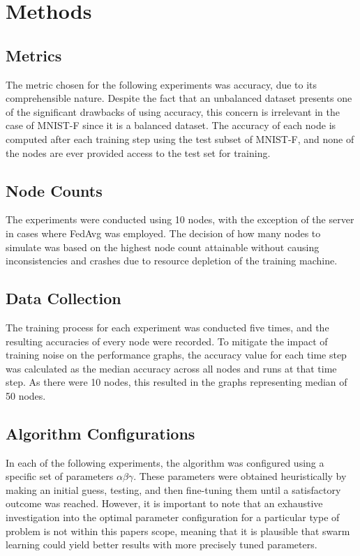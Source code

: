 \section{Methods}
\subsection{Metrics}
The metric chosen for the following experiments was accuracy, due to its comprehensible nature. Despite the fact that an unbalanced dataset presents one of the significant drawbacks of using accuracy, this concern is irrelevant in the case of MNIST-F since it is a balanced dataset. The accuracy of each node is computed after each training step using the test subset of MNIST-F, and none of the nodes are ever provided access to the test set for training.

\subsection{Node Counts}
The experiments were conducted using 10 nodes, with the exception of the server in cases where FedAvg was employed. The decision of how many nodes to simulate was based on the highest node count attainable without causing inconsistencies and crashes due to resource depletion of the training machine.

\subsection{Data Collection}
The training process for each experiment was conducted five times, and the resulting accuracies of every node were recorded. To mitigate the impact of training noise on the performance graphs, the accuracy value for each time step was calculated as the median accuracy across all nodes and runs at that time step. As there were 10 nodes, this resulted in the graphs representing median of 50 nodes.

\subsection{Algorithm Configurations}
In each of the following experiments, the algorithm was configured using a specific set of parameters $\alpha \beta \gamma$. These parameters were obtained heuristically by making an initial guess, testing, and then fine-tuning them until a satisfactory outcome was reached. However, it is important to note that an exhaustive investigation into the optimal parameter configuration for a particular type of problem is not within this papers scope, meaning that it is plausible that swarm learning could yield better results with more precisely tuned parameters.

